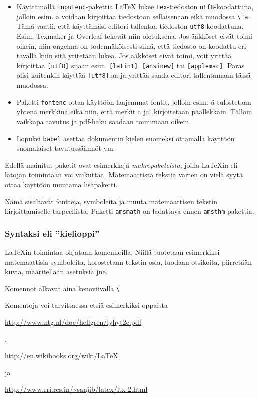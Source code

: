 \begin{frame}[fragile]
    \begin{extra}
        \begin{itemize}
            \item Käyttämällä \verb-inputenc--pakettia \LaTeX{} lukee \verb-tex--tiedoston \verb-utf8--koodattuna, jolloin esim. ä voidaan kirjoittaa tiedostoon sellaisenaan eikä muodossa \verb-\"a-. Tämä vaatii, että käyttämäsi editori tallentaa tiedoston \verb-utf8--koodattuna. Esim. Texmaker ja Overleaf tekevät niin oletuksena. Jos ääkköset eivät toimi oikein, niin ongelma on todennäköisesti siinä, että tiedosto on koodattu eri tavalla kuin sitä yritetään lukea. Jos ääkköset eivät toimi, voit yrittää kirjoittaa \verb-[utf8]- sijaan esim. \verb-[latin1]-, \verb-[ansinew]- tai \verb-[applemac]-. Paras olisi kuitenkin käyttää \verb-[utf8]-:aa ja yrittää saada editori tallentamaan tässä muodossa.
            \item Paketti \verb-fontenc- ottaa käyttöön laajemmat fontit, jolloin esim. ä tulostetaan yhtenä merkkinä eikä niin, että merkit a ja \"{} kirjoitetaan päällekkäin. Tällöin vaikkapa tavutus ja pdf-haku saadaan toimimaan oikein.
            \item Lopuksi \verb-babel- asettaa dokumentin kielen suomeksi ottamalla käyttöön suomalaiset tavutussäännöt ym.
        \end{itemize}
    \end{extra}
\end{frame}
\begin{frame}[fragile]
    
\end{frame}
\begin{frame}[fragile]
    Edellä mainitut paketit ovat esimerkkejä \textit{makropaketeista}, joilla \LaTeX in eli latojan toimintaan voi vaikuttaa. 
    \pause
    Matemaattista tekstiä varten on vielä syytä ottaa käyttöön muutama lisäpaketti. 
    
    \pause
    Nämä sisältävät fontteja, symboleita ja muuta matemaattisen tekstin kirjoittamiselle tarpeellista. Paketti \verb-amsmath- on ladattava ennen \verb-amsthm--pakettia.
\end{frame}
\begin{frame}[fragile]
    \frametitle{Syntaksi eli ''kielioppi''}
    \LaTeX in toimintaa ohjataan komennoilla. \pause Niillä tuotetaan esimerkiksi matemaattisia symboleita, korostetaan tekstin osia, luodaan otsikoita, piirretään kuvia, määritellään asetuksia jne.  \pause
    \begin{framed}
        Komennot alkavat aina kenoviivalla \verb-\-
    \end{framed}
    \pause
    Komentoja voi tarvittaessa etsiä esimerkiksi oppaista \begin{scriptsize}
        \url{http://www.ntg.nl/doc/hellgren/lyhyt2e.pdf}
    \end{scriptsize},
    \begin{scriptsize}
        \url{http://en.wikibooks.org/wiki/LaTeX}
    \end{scriptsize} ja
    \begin{scriptsize}
        \url{http://www.rri.res.in/~sanjib/latex/ltx-2.html}
    \end{scriptsize}
\end{frame}
